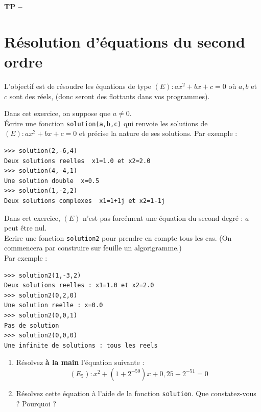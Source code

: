 





\begin{center}
{\Large\bf TP \no {\num} -- \descrip}
\end{center}



\section{R\' esolution d'\' equations du second ordre}
\noindent L'objectif est de r\' esoudre les \' equations de type $(E)\colon ax^2+bx+c=0$ o\` u $a,b$ et $c$ sont des r\' eels, (donc seront des flottants dans vos programmes).

\begin{exercice}
Dans cet exercice, on suppose que $a\neq 0$.\\
\' Ecrire une fonction \verb?solution(a,b,c)? qui renvoie les solutions de $(E)\colon ax^2+bx+c=0$ et pr\' ecise la nature de ses solutions. Par exemple :
\begin{verbatim}
>>> solution(2,-6,4)
Deux solutions reelles  x1=1.0 et x2=2.0
>>> solution(4,-4,1)
Une solution double  x=0.5
>>> solution(1,-2,2)
Deux solutions complexes  x1=1+1j et x2=1-1j
\end{verbatim}
\end{exercice}


\begin{exercice}
Dans cet exercice, $(E)$ n'est pas forc\' ement une \' equation du second degr\' e : $a$ peut \^ etre nul.\\
Ecrire une fonction \verb?solution2? pour prendre en compte tous les cas. (On commencera par construire sur feuille un algorigramme.)\\
Par exemple :
\begin{verbatim}
>>> solution2(1,-3,2)
Deux solutions reelles : x1=1.0 et x2=2.0
>>> solution2(0,2,0)
Une solution reelle : x=0.0
>>> solution2(0,0,1)
Pas de solution
>>> solution2(0,0,0)
Une infinite de solutions : tous les reels
\end{verbatim}
\end{exercice}


\begin{exercice}
\begin{enumerate}
\item R\' esolvez \textbf{\` a la main} l'\' equation suivante : 
\[(E_5)\colon x^2+(1+2^{-50})x+0,25+2^{-51}=0\]
\item R\' esolvez cette \' equation \` a l'aide de la fonction \verb?solution?. Que constatez-vous ? Pourquoi ?
\end{enumerate}
\end{exercice}

